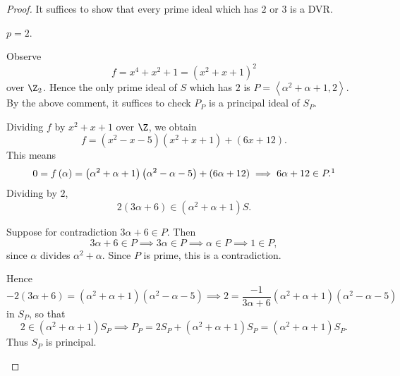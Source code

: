 \documentclass[pmath441]{subfiles}
\begin{document}
    \begin{proof}
        It suffices to show that every prime ideal which has $2$ or $3$ is a DVR.

        \begin{case}
            $p=2$.

            Observe
            \begin{equation*}
                f = x^{4}+x^{2}+1 = \left( x^{2}+x+1 \right)^{2}
            \end{equation*}
            over $\Z_2$. Hence the only prime ideal of $S$ which has $2$ is $P=\left< \alpha^{2}+\alpha+1,2 \right>$. By the above comment, it suffices to check $P_P$ is a principal ideal of $S_P$.

            Dividing $f$ by $x^{2}+x+1$ over $\Z$, we obtain
            \begin{equation*}
                f = \left( x^{2}-x-5 \right)\left( x^{2}+x+1 \right) + \left( 6x+12 \right).
            \end{equation*}
            This means
            \begin{equation*}
                0 = f\left( \alpha \right) = \left( \alpha^{2}+\alpha+1 \right)\left( \alpha^{2}-\alpha-5 \right) + \left( 6\alpha+12 \right) \implies 6\alpha+12\in P.\footnotemark[1]
            \end{equation*}
            Dividing by $2$,
            \begin{equation*}
                2\left( 3\alpha+6 \right)\in \left( \alpha^{2}+\alpha+1 \right)S.
            \end{equation*}

            Suppose for contradiction $3\alpha+6\in P$. Then
            \begin{equation*}
                3\alpha+6\in P \implies 3\alpha\in P\implies \alpha\in P\implies 1\in P,
            \end{equation*}
            since $\alpha$ divides $\alpha^{2}+\alpha$. Since $P$ is prime, this is a contradiction.

            Hence
            \begin{equation*}
                -2\left( 3\alpha+6 \right) = \left( \alpha^{2}+\alpha+1 \right)\left( \alpha^{2}-\alpha-5 \right) \implies 2 = \frac{-1}{3\alpha+6}\left( \alpha^{2}+\alpha+1 \right)\left( \alpha^{2}-\alpha-5 \right)
            \end{equation*}
            in $S_P$, so that
            \begin{equation*}
                2 \in \left( \alpha^{2}+\alpha+1 \right)S_P \implies P_P = 2S_P + \left( \alpha^{2}+\alpha+1 \right)S_P = \left( \alpha^{2}+\alpha+1 \right)S_P.
            \end{equation*}
            Thus $S_P$ is principal.
        \end{case}


\end{proof}
\end{document}
